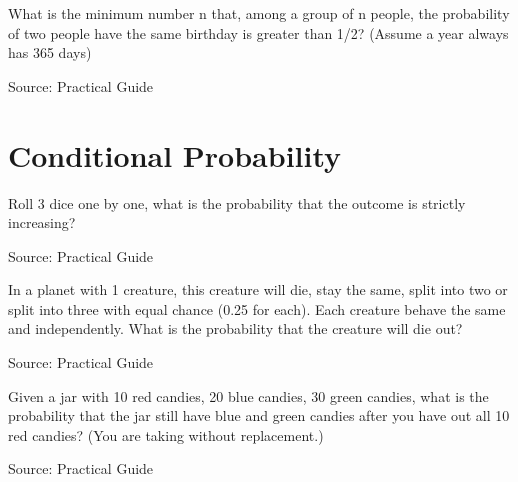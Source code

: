 \begin{exe}
What is the minimum number n that, among a group of n people, the probability of two people have the same birthday is greater than 1/2? (Assume a year always has 365 days)
\end{exe}
\begin{teacher}
Source: Practical Guide
\begin{sol}
\end{sol}
\end{teacher}

\section{Conditional Probability}
\begin{exe}
Roll 3 dice one by one, what is the probability that the outcome is strictly increasing?
\end{exe}
Source: Practical Guide
\begin{teacher}
\begin{sol}
\end{sol}
\end{teacher}

\begin{exe}
In a planet with 1 creature, this creature will die, stay the same, split into two or split into three with equal chance (0.25 for each). Each creature behave the same and independently. What is the probability that the creature will die out?
\end{exe}
Source: Practical Guide
\begin{teacher}
\begin{sol}
\end{sol}
\end{teacher}

\begin{exe}
Given a jar with 10 red candies, 20 blue candies, 30 green candies, what is the probability that the jar still have blue and green candies after you have out all 10 red candies? (You are taking without replacement.)

\end{exe}
\begin{teacher}
\begin{sol}
\end{sol}
\end{teacher}

\begin{exe}

\end{exe}
Source: Practical Guide
\begin{teacher}
\begin{sol}
\end{sol}
\end{teacher}

